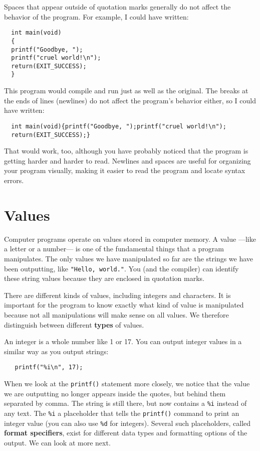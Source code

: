 Spaces that appear outside of quotation marks generally do
not affect the behavior of the program.  For example, I
could have written:

\begin{verbatim}
  int main(void)
  {
  printf("Goodbye, ");
  printf("cruel world!\n");	     
  return(EXIT_SUCCESS);
  }
\end{verbatim}
%
This program would compile and run just as well as the original.
The breaks at the ends of lines (newlines) do not affect
the program's behavior either, so I could have written:

\begin{verbatim}
  int main(void){printf("Goodbye, ");printf("cruel world!\n");
  return(EXIT_SUCCESS);}
\end{verbatim}
%
That would work, too, although you have probably noticed that
the program is getting harder and harder to read.  Newlines and
spaces are useful for organizing your program visually, making
it easier to read the program and locate syntax errors.

\section{Values}

Computer programs operate on values stored in 
computer memory.
A value ---like a letter or
a number--- is one of the fundamental things that a program manipulates.  
The only values we have
manipulated so far are the strings we have been outputting, like
{\tt "Hello, world."}.  You (and the compiler) can identify
these string values because they are enclosed in quotation marks.

There are different kinds of values, including integers and characters.
It is important for the program to know exactly what kind of value
is manipulated because not all manipulations will make sense on all
values.
We therefore distinguish between different {\bf types} of values.  

An integer is a whole number like 1 or 17.  You can output
integer values in a similar way as you output strings:

\begin{verbatim}
   printf("%i\n", 17);
\end{verbatim}
%
When we look at the \texttt{printf()} statement more closely, we
notice that the value we are outputting no longer appears
inside the quotes, but behind them separated by comma.
The string is still there, but now contains a {\tt \%i} instead of
any text. 
The {\tt \%i} a placeholder that tells the \texttt{printf()} command
to print an integer value (you can also use {\tt \%d} for integers). 
Several such placeholders, called {\bf format specifiers}, exist
for different data types and formatting options of the output. 
We can look at more next.

